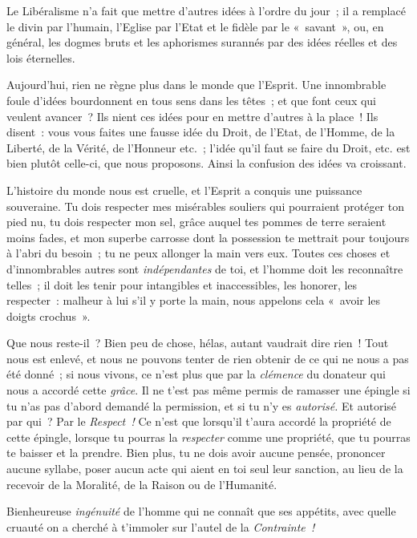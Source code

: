 \documentclass[french,twoside]{book} %
\begin{document}
Le Libéralisme n’a fait que mettre d’autres idées à l’ordre du jour ; il a remplacé le divin par l’humain, l’Eglise par l’Etat et le fidèle par le « savant », ou, en général, les dogmes bruts et les aphorismes surannés par des idées réelles et des lois éternelles.\par
Aujourd’hui, rien ne règne plus dans le monde que l’Esprit. Une innombrable foule d’idées bourdonnent en tous sens dans les têtes ; et que font ceux qui veulent avancer ? Ils nient ces idées pour en mettre d’autres à la place ! Ils disent : vous vous faites une fausse idée du Droit, de l’Etat, de l’Homme, de la Liberté, de la Vérité, de l’Honneur etc. ; l’idée qu’il faut se faire du Droit, etc. est bien plutôt celle-ci, que nous proposons. Ainsi la confusion des idées va croissant.\par
L’histoire du monde nous est cruelle, et l’Esprit a conquis une puissance souveraine. Tu dois respecter mes misérables souliers qui pourraient protéger ton pied nu, tu dois respecter mon sel, grâce auquel tes pommes de terre seraient moins fades, et mon superbe carrosse dont la possession te mettrait pour toujours à l’abri du besoin ; tu ne peux allonger la main vers eux. Toutes ces choses et d’innombrables autres sont \emph{indépendantes} de toi, et l’homme doit les reconnaître telles ; il doit les tenir pour intangibles et inaccessibles, les honorer, les respecter : malheur à lui s’il y porte la main, nous appelons cela « avoir les doigts crochus ».\par
Que nous reste-il ? Bien peu de chose, hélas, autant vaudrait dire rien ! Tout nous est enlevé, et nous ne pouvons tenter de rien obtenir de ce qui ne nous a pas été donné ; si nous vivons, ce n’est plus que par la \emph{clémence} du donateur qui nous a accordé cette \emph{grâce}. Il ne t’est pas même permis de ramasser une épingle si  tu n’as pas d’abord demandé la permission, et si tu n’y es \emph{autorisé.} Et autorisé par qui ? Par le \emph{Respect ! }Ce n’est que lorsqu’il t’aura accordé la propriété de cette épingle, lorsque tu pourras la \emph{respecter} comme une propriété, que tu pourras te baisser et la prendre. Bien plus, tu ne dois avoir aucune pensée, prononcer aucune syllabe, poser aucun acte qui aient en toi seul leur sanction, au lieu de la recevoir de la Moralité, de la Raison ou de l’Humanité.\par
Bienheureuse \emph{ingénuité} de l’homme qui ne connaît que ses appétits, avec quelle cruauté on a cherché à t’immoler sur l’autel de la \emph{Contrainte !}\par
\end{document}
